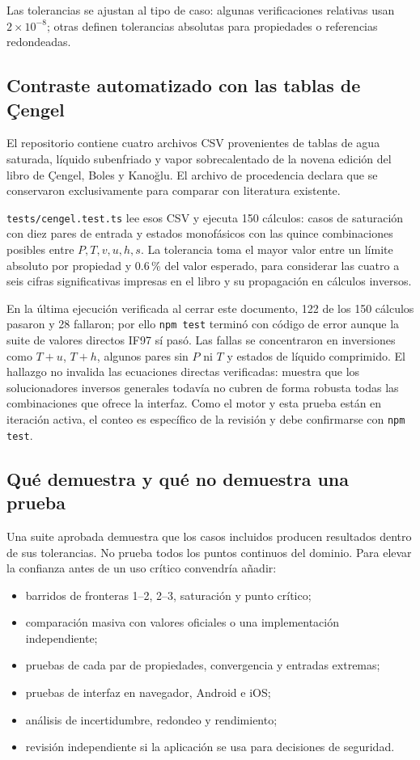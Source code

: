 \documentclass[11pt,a4paper,oneside]{article}
\newcommand{\code}[1]{\texttt{#1}}
\begin{document}
Las tolerancias se ajustan al tipo de caso: algunas verificaciones relativas usan $2\times10^{-8}$; otras definen tolerancias absolutas para propiedades o referencias redondeadas.

\subsection{Contraste automatizado con las tablas de \c{C}engel}

El repositorio contiene cuatro archivos CSV provenientes de tablas de agua saturada, l\'iquido subenfriado y vapor sobrecalentado de la novena edici\'on del libro de \c{C}engel, Boles y Kano\u{g}lu. El archivo de procedencia declara que se conservaron exclusivamente para comparar con literatura existente.

\code{tests/cengel.test.ts} lee esos CSV y ejecuta 150 c\'alculos: casos de saturaci\'on con diez pares de entrada y estados monof\'asicos con las quince combinaciones posibles entre $P,T,v,u,h,s$. La tolerancia toma el mayor valor entre un l\'imite absoluto por propiedad y 0.6\,\% del valor esperado, para considerar las cuatro a seis cifras significativas impresas en el libro y su propagaci\'on en c\'alculos inversos.

En la \'ultima ejecuci\'on verificada al cerrar este documento, 122 de los 150 c\'alculos pasaron y 28 fallaron; por ello \code{npm test} termin\'o con c\'odigo de error aunque la suite de valores directos IF97 s\'i pas\'o. Las fallas se concentraron en inversiones como $T+u$, $T+h$, algunos pares sin $P$ ni $T$ y estados de l\'iquido comprimido. El hallazgo no invalida las ecuaciones directas verificadas: muestra que los solucionadores inversos generales todav\'ia no cubren de forma robusta todas las combinaciones que ofrece la interfaz. Como el motor y esta prueba est\'an en iteraci\'on activa, el conteo es espec\'ifico de la revisi\'on y debe confirmarse con \code{npm test}.

\subsection{Qu\'e demuestra y qu\'e no demuestra una prueba}

Una suite aprobada demuestra que los casos incluidos producen resultados dentro de sus tolerancias. No prueba todos los puntos continuos del dominio. Para elevar la confianza antes de un uso cr\'itico convendr\'ia a\~nadir:

\begin{itemize}
  \item barridos de fronteras 1--2, 2--3, saturaci\'on y punto cr\'itico;
  \item comparaci\'on masiva con valores oficiales o una implementaci\'on independiente;
  \item pruebas de cada par de propiedades, convergencia y entradas extremas;
  \item pruebas de interfaz en navegador, Android e iOS;
  \item an\'alisis de incertidumbre, redondeo y rendimiento;
  \item revisi\'on independiente si la aplicaci\'on se usa para decisiones de seguridad.
\end{itemize}
\end{document}
